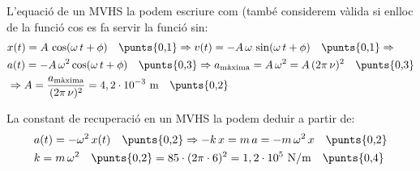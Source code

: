 \begin{solapartat}
L'equació de un MVHS la podem escriure com (també considerem vàlida si enlloc de la funció cos es fa servir la funció sin:
\begin{align*}
&x(t) = A\,\cos(\omega\,t + \phi) \quad \text{\punts{0,1}} \Rightarrow v(t) = -A\,\omega\,\sin(\omega\,t + \phi) \quad \text{\punts{0,1}} \Rightarrow\\
&a(t) = -A\,\omega^2\cos(\omega\,t + \phi) \quad \text{\punts{0,3}} \Rightarrow a_\text{màxima} = A\,\omega^2 = A\,(2\pi\,\nu)^2 \quad \text{\punts{0,3}}\\
&\Rightarrow A = \frac{a_\text{màxima}}{(2\pi\,\nu)^2} = 4,2\cdot 10^{-3}\ \mathrm{m} \quad \text{\punts{0,2}}
\end{align*}
\end{solapartat}

\begin{solapartat}
La constant de recuperació en un MVHS la podem deduir a partir de:
\begin{align*}
&a(t) = -\omega^2\,x(t) \quad \text{\punts{0,2}} \Rightarrow -k\,x = m\,a = -m\,\omega^2\,x \quad \text{\punts{0,2}}\\
&k = m\,\omega^2 \quad \text{\punts{0,2}} = 85\cdot(2\pi\cdot 6)^2 = 1,2\cdot 10^{5}\ \mathrm{N/m} \quad \text{\punts{0,4}}
\end{align*}
\end{solapartat}
